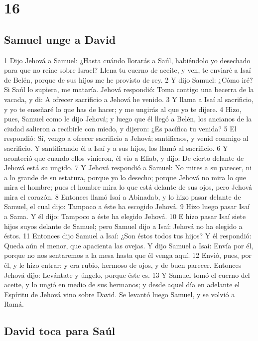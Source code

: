 \chapter{16}

\section*{Samuel unge a David}


1 Dijo Jehová a Samuel: ¿Hasta cuándo llorarás a Saúl, habiéndolo yo desechado para que no reine sobre Israel? Llena tu cuerno de aceite, y ven, te enviaré a Isaí de Belén, porque de sus hijos me he provisto de rey.
2 Y dijo Samuel: ¿Cómo iré? Si Saúl lo supiera, me mataría. Jehová respondió: Toma contigo una becerra de la vacada, y di: A ofrecer sacrificio a Jehová he venido.
3 Y llama a Isaí al sacrificio, y yo te enseñaré lo que has de hacer; y me ungirás al que yo te dijere.
4 Hizo, pues, Samuel como le dijo Jehová; y luego que él llegó a Belén, los ancianos de la ciudad salieron a recibirle con miedo, y dijeron: ¿Es pacífica tu venida?
5 El respondió: Sí, vengo a ofrecer sacrificio a Jehová; santificaos, y venid conmigo al sacrificio. Y santificando él a Isaí y a sus hijos, los llamó al sacrificio.
6 Y aconteció que cuando ellos vinieron, él vio a Eliab, y dijo: De cierto delante de Jehová está su ungido.
7 Y Jehová respondió a Samuel: No mires a su parecer, ni a lo grande de su estatura, porque yo lo desecho; porque Jehová no mira lo que mira el hombre; pues el hombre mira lo que está delante de sus ojos, pero Jehová mira el corazón.
8 Entonces llamó Isaí a Abinadab, y lo hizo pasar delante de Samuel, el cual dijo: Tampoco a éste ha escogido Jehová. 
9 Hizo luego pasar Isaí a Sama. Y él dijo: Tampoco a éste ha elegido Jehová.
10 E hizo pasar Isaí siete hijos suyos delante de Samuel; pero Samuel dijo a Isaí: Jehová no ha elegido a éstos.
11 Entonces dijo Samuel a Isaí: ¿Son éstos todos tus hijos? Y él respondió: Queda aún el menor, que apacienta las ovejas. Y dijo Samuel a Isaí: Envía por él, porque no nos sentaremos a la mesa hasta que él venga aquí.
12 Envió, pues, por él, y le hizo entrar; y era rubio, hermoso de ojos, y de buen parecer. Entonces Jehová dijo: Levántate y úngelo, porque éste es.
13 Y Samuel tomó el cuerno del aceite, y lo ungió en medio de sus hermanos; y desde aquel día en adelante el Espíritu de Jehová vino sobre David. Se levantó luego Samuel, y se volvió a Ramá.
\section*{David toca para Saúl}

